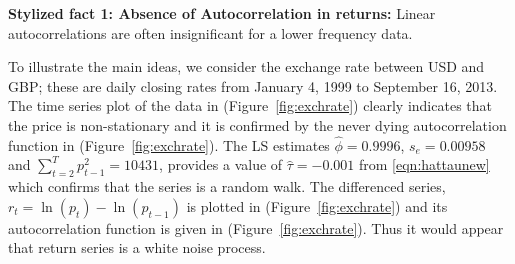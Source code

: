 \noindent\textbf{Stylized fact 1: Absence of Autocorrelation in returns:} Linear autocorrelations are often insignificant for a lower frequency data. 


To illustrate the main ideas, we consider the exchange rate between USD and GBP; these are daily closing rates from January 4, 1999 to September 16, 2013. The time series plot of the data in (Figure~\ref{fig:exchrate}) clearly indicates that the price is non-stationary and it is confirmed by the never dying autocorrelation function in (Figure~\ref{fig:exchrate}). The LS estimates $\hat{\phi}= 0.9996$, $s_e= 0.00958$ and $\sum_{t=2}^T p_{t-1}^2 = 10431$, provides a value of $\hat{\tau} = -0.001$ from \eqref{eqn:hattaunew} which confirms that the series is a random walk. The differenced series, $r_t = \ln{(p_t)} - \ln{(p_{t-1})}$ is plotted in (Figure~\ref{fig:exchrate}) and its autocorrelation function is given in (Figure~\ref{fig:exchrate}). Thus it would appear that return series is a white noise process.


